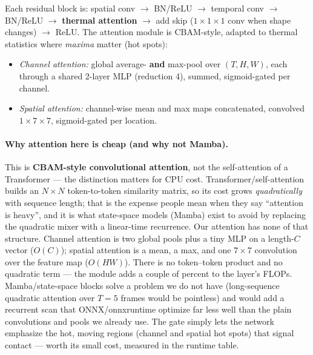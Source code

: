 \documentclass[11pt]{article}
\begin{document}
Each residual block is: spatial conv $\rightarrow$ BN/ReLU $\rightarrow$
temporal conv $\rightarrow$ BN/ReLU $\rightarrow$ \textbf{thermal attention}
$\rightarrow$ add skip ($1{\times}1{\times}1$ conv when shape changes)
$\rightarrow$ ReLU. The attention module is CBAM-style, adapted to thermal
statistics where \emph{maxima} matter (hot spots):

\begin{itemize}
\item \emph{Channel attention:} global average- \textbf{and} max-pool over
      $(T,H,W)$, each through a shared 2-layer MLP (reduction 4), summed,
      sigmoid-gated per channel.
\item \emph{Spatial attention:} channel-wise mean and max maps concatenated,
      convolved $1{\times}7{\times}7$, sigmoid-gated per location.
\end{itemize}

\paragraph{Why attention here is cheap (and why not Mamba).}
This is \textbf{CBAM-style convolutional attention}, not the
self-attention of a Transformer --- the distinction matters for CPU cost.
Transformer/self-attention builds an $N\times N$ token-to-token similarity
matrix, so its cost grows \emph{quadratically} with sequence length; that
is the expense people mean when they say ``attention is heavy'', and it is
what state-space models (Mamba) exist to avoid by replacing the quadratic
mixer with a linear-time recurrence. Our attention has none of that
structure. Channel attention is two global pools plus a tiny MLP on a
length-$C$ vector ($O(C)$); spatial attention is a mean, a max, and one
$7{\times}7$ convolution over the feature map ($O(HW)$). There is no
token--token product and no quadratic term --- the module adds a couple of
percent to the layer's FLOPs. Mamba/state-space blocks solve a problem we
do not have (long-sequence quadratic attention over $T{=}5$ frames would be
pointless) and would add a recurrent scan that ONNX/onnxruntime optimize
far less well than the plain convolutions and pools we already use. The
gate simply lets the network emphasize the hot, moving regions (channel and
spatial hot spots) that signal contact --- worth its small cost, measured in
the runtime table.
\end{document}
